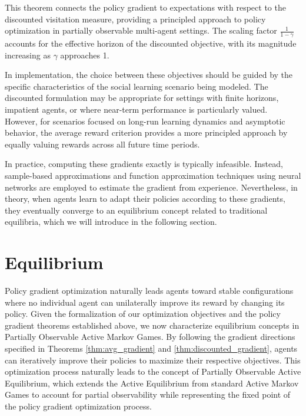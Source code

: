\documentclass[a4paper,12pt]{report}
\begin{document}
This theorem connects the policy gradient to expectations with respect to the discounted visitation measure, providing a principled approach to policy optimization in partially observable multi-agent settings. The scaling factor $\frac{1}{1-\gamma}$ accounts for the effective horizon of the discounted objective, with its magnitude increasing as $\gamma$ approaches 1.

In implementation, the choice between these objectives should be guided by the specific characteristics of the social learning scenario being modeled. The discounted formulation may be appropriate for settings with finite horizons, impatient agents, or where near-term performance is particularly valued. However, for scenarios focused on long-run learning dynamics and asymptotic behavior, the average reward criterion provides a more principled approach by equally valuing rewards across all future time periods.

In practice, computing these gradients exactly is typically infeasible. Instead, sample-based approximations and function approximation techniques using neural networks are employed to estimate the gradient from experience. Nevertheless, in theory, when agents learn to adapt their policies according to these gradients, they eventually converge to an equilibrium concept related to traditional equilibria, which we will introduce in the following section.

\section{Equilibrium}
Policy gradient optimization naturally leads agents toward stable configurations where no individual agent can unilaterally improve its reward by changing its policy. Given the formalization of our optimization objectives and the policy gradient theorems established above, we now characterize equilibrium concepts in Partially Observable Active Markov Games. By following the gradient directions specified in Theorems \ref{thm:avg_gradient} and \ref{thm:discounted_gradient}, agents can iteratively improve their policies to maximize their respective objectives. This optimization process naturally leads to the concept of Partially Observable Active Equilibrium, which extends the Active Equilibrium from standard Active Markov Games \cite{kim2022influencing} to account for partial observability while representing the fixed point of the policy gradient optimization process.
\end{document}
